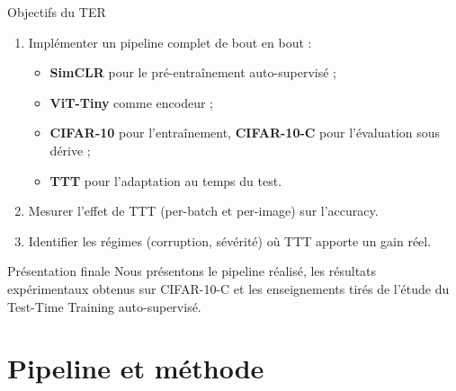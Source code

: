 \documentclass[10pt,aspectratio=169]{beamer}
\begin{document}
\begin{frame}{Objectifs du TER}
  \begin{enumerate}
    \item Implémenter un pipeline complet de bout en bout :
    \begin{itemize}
      \item \textbf{SimCLR} pour le pré-entraînement auto-supervisé ;
      \item \textbf{ViT-Tiny} comme encodeur ;
      \item \textbf{CIFAR-10} pour l'entraînement, \textbf{CIFAR-10-C} pour l'évaluation sous dérive ;
      \item \textbf{TTT} pour l'adaptation au temps du test.
    \end{itemize}
    \item Mesurer l'effet de TTT (per-batch et per-image) sur l'accuracy.
    \item Identifier les régimes (corruption, sévérité) où TTT apporte un gain réel.
  \end{enumerate}

  \vspace{0.5em}
  \begin{block}{Présentation finale}
    Nous présentons le pipeline réalisé, les résultats expérimentaux obtenus sur CIFAR-10-C et les enseignements tirés de l'étude du Test-Time Training auto-supervisé.
  \end{block}
\end{frame}

\section{Pipeline et méthode}
\end{document}
